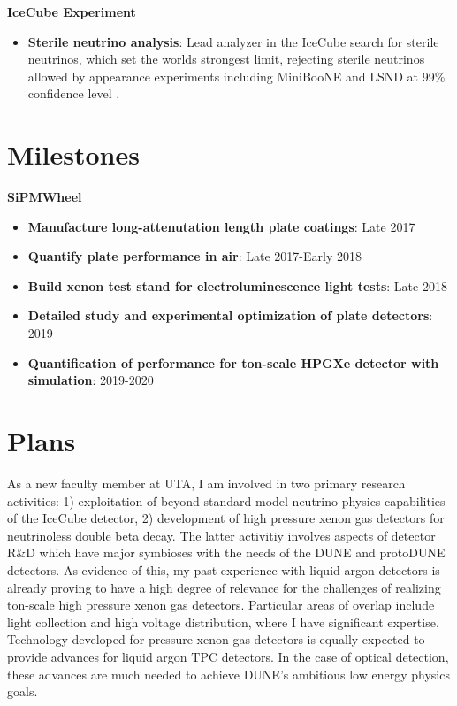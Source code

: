 \noindent\textbf{IceCube Experiment}
\begin{itemize}[noitemsep,nolistsep]
\item{\textbf{Sterile neutrino analysis}}: Lead analyzer in the IceCube search for sterile neutrinos, which  set the worlds strongest limit, rejecting sterile neutrinos allowed by appearance experiments including MiniBooNE and LSND at 99\% confidence level \cite{TheIceCube:2016oqi}.
\end{itemize}



\section*{\textbf{Milestones}}
\noindent\textbf{SiPMWheel}
\begin{itemize}[noitemsep,nolistsep]
\item{\textbf{Manufacture long-attenutation length plate coatings}}: Late 2017
\item{\textbf{Quantify plate performance in air}}: Late 2017-Early 2018
\item{\textbf{Build xenon test stand for electroluminescence light tests}}: Late 2018
\item{\textbf{Detailed study and experimental optimization of plate detectors}}: 2019
\item{\textbf{Quantification of performance for ton-scale HPGXe detector with simulation}}: 2019-2020

\end{itemize}

\section*{\textbf{Plans}}
As a new faculty member at UTA, I am involved in two primary research activities: 1) exploitation of beyond-standard-model neutrino physics capabilities of the IceCube detector, 2) development of high pressure xenon gas detectors for neutrinoless double beta decay.  The latter activitiy involves aspects of detector R\&D which have major symbioses with the needs of the DUNE and protoDUNE detectors.  As evidence of this, my past experience with liquid argon detectors is already proving to have a high degree of relevance for the challenges of realizing ton-scale high pressure xenon gas detectors.  Particular areas of overlap include light collection and high voltage distribution, where I have significant expertise.  Technology developed for pressure xenon gas detectors is equally expected to provide advances for liquid argon TPC detectors.  In the case of optical detection, these advances are much needed to achieve DUNE's ambitious low energy physics goals.  

